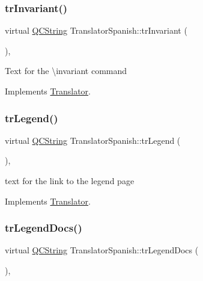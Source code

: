 \subsubsection{\texorpdfstring{trInvariant()}{trInvariant()}}
{\footnotesize\ttfamily virtual \mbox{\hyperlink{class_q_c_string}{Q\+C\+String}} Translator\+Spanish\+::tr\+Invariant (\begin{DoxyParamCaption}{ }\end{DoxyParamCaption})\hspace{0.3cm}{\ttfamily [inline]}, {\ttfamily [virtual]}}

Text for the \textbackslash{}invariant command 

Implements \mbox{\hyperlink{class_translator}{Translator}}.

\mbox{\label{class_translator_spanish_a99875d1ae2378f0d0d011bf4fcea85bf}} 
\subsubsection{\texorpdfstring{trLegend()}{trLegend()}}
{\footnotesize\ttfamily virtual \mbox{\hyperlink{class_q_c_string}{Q\+C\+String}} Translator\+Spanish\+::tr\+Legend (\begin{DoxyParamCaption}{ }\end{DoxyParamCaption})\hspace{0.3cm}{\ttfamily [inline]}, {\ttfamily [virtual]}}

text for the link to the legend page 

Implements \mbox{\hyperlink{class_translator}{Translator}}.

\mbox{\label{class_translator_spanish_a4290436e8ccc955b47ade0df3dc79c77}} 
\subsubsection{\texorpdfstring{trLegendDocs()}{trLegendDocs()}}
{\footnotesize\ttfamily virtual \mbox{\hyperlink{class_q_c_string}{Q\+C\+String}} Translator\+Spanish\+::tr\+Legend\+Docs (\begin{DoxyParamCaption}{ }\end{DoxyParamCaption})\hspace{0.3cm}{\ttfamily [inline]}, {\ttfamily [virtual]}}

